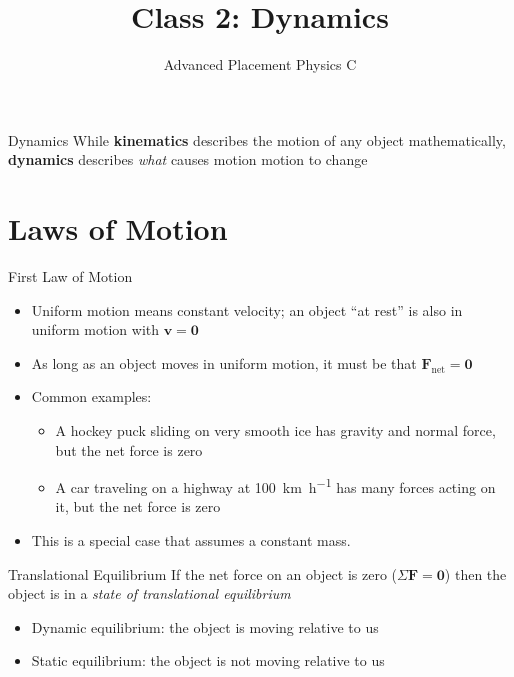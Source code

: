\documentclass[12pt,compress,aspectratio=169]{beamer}
\title{Class 2: Dynamics}
\subtitle{Advanced Placement Physics C}
\begin{document}
\begin{frame}
  \maketitle
\end{frame}



\begin{frame}{Dynamics}
  While \textbf{kinematics} describes the motion of any object mathematically,
  \textbf{dynamics} describes \emph{what} causes motion motion to change
\end{frame}



\section{Laws of Motion}

\begin{frame}{First Law of Motion}
  \begin{center}
  \end{center}
  \begin{itemize}
  \item Uniform motion means constant velocity; an object ``at rest'' is also
    in uniform motion with $\bm v=\bm 0$
  \item As long as an object moves in uniform motion, it must be that
    $\bm F_\text{net}=\bm 0$
  \item Common examples:
    \begin{itemize}
    \item A hockey puck sliding on very smooth ice has gravity and normal
      force, but the net force is zero
    \item A car traveling on a highway at \SI{100}{\kilo\metre\per\hour}
      has many forces acting on it, but the net force is zero 
    \end{itemize}
  \item\textcolor{red!80!black}{This is a special case that assumes a constant
    mass.}
  \end{itemize}
\end{frame}


\begin{frame}{Translational Equilibrium}
  If the net force on an object is zero ($\Sigma\bm F=\bm 0$) then the
  object is in a \emph{state of translational equilibrium}
  \begin{itemize}
  \item Dynamic equilibrium: the object is moving relative to us
  \item Static equilibrium: the object is not moving relative to us
  \end{itemize}
\end{frame}
\end{document}

